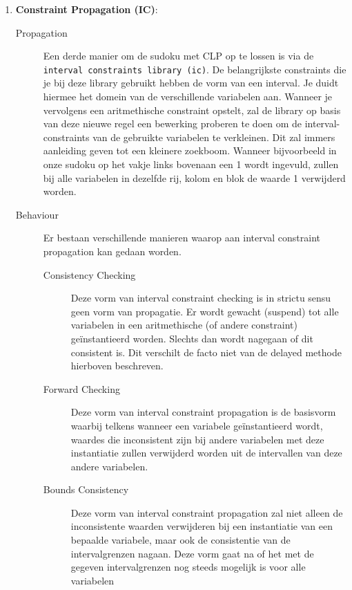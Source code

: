 \begin{enumerate}
\begin{description}
        \end{description}
 \item \textbf{Constraint Propagation (IC)}:
        \begin{description}
         \item[Propagation]
        Een derde manier om de sudoku met CLP op te lossen is via de \verb|interval constraints library (ic)|. De belangrijkste constraints
        die je bij deze library gebruikt hebben de vorm van een interval. Je duidt hiermee het domein van de verschillende
        variabelen aan. Wanneer je vervolgens een aritmethische constraint opstelt, zal de library op basis van deze nieuwe
        regel een bewerking proberen te doen om de interval-constraints van de gebruikte variabelen te verkleinen. Dit zal immers
        aanleiding geven tot een kleinere zoekboom. Wanneer bijvoorbeeld in onze sudoku op het vakje links bovenaan een 1 wordt
        ingevuld, zullen bij alle variabelen in dezelfde rij, kolom en blok de waarde 1 verwijderd worden. 
         \item[Behaviour]
        Er bestaan verschillende manieren waarop aan interval constraint propagation kan gedaan worden.
                \begin{description}
                \item[Consistency Checking] 
                        Deze vorm van interval constraint checking is in strictu sensu geen vorm van propagatie. Er wordt
                        gewacht (suspend) tot alle variabelen in een aritmethische (of andere constraint) ge\"instantieerd worden.
                        Slechts dan wordt nagegaan of dit consistent is. Dit verschilt de facto niet van de delayed methode
                        hierboven beschreven.
                \item[Forward Checking]         
                        Deze vorm van interval constraint propagation is de basisvorm waarbij telkens wanneer een variabele
                        ge\"instantieerd wordt, waardes die inconsistent zijn bij andere variabelen met deze instantiatie zullen verwijderd 
                        worden uit de intervallen van deze andere variabelen.
                \item[Bounds Consistency] 
                        Deze vorm van interval constraint propagation zal niet alleen de inconsistente waarden verwijderen
                        bij een instantiatie van een bepaalde variabele, maar ook de consistentie van de intervalgrenzen nagaan.
                        Deze vorm gaat na of het met de gegeven intervalgrenzen nog steeds mogelijk is voor alle variabelen

\end{description}
\end{description}
\end{enumerate}
